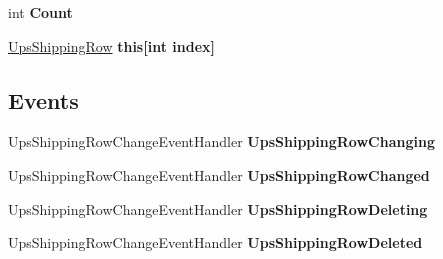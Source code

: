 \begin{DoxyCompactItemize}
\item 
int {\bfseries Count}\hypertarget{class_products_1_1_data_1_1ds_sage_1_1_ups_shipping_data_table_a0e08d69b2780d8485f76b3cde6fb65ab}{}\label{class_products_1_1_data_1_1ds_sage_1_1_ups_shipping_data_table_a0e08d69b2780d8485f76b3cde6fb65ab}

\item 
\hyperlink{class_products_1_1_data_1_1ds_sage_1_1_ups_shipping_row}{Ups\+Shipping\+Row} {\bfseries this\mbox{[}int index\mbox{]}}\hypertarget{class_products_1_1_data_1_1ds_sage_1_1_ups_shipping_data_table_ad176ac9cc4931b824d75b37665130b23}{}\label{class_products_1_1_data_1_1ds_sage_1_1_ups_shipping_data_table_ad176ac9cc4931b824d75b37665130b23}

\end{DoxyCompactItemize}
\subsection*{Events}
\begin{DoxyCompactItemize}
\item 
Ups\+Shipping\+Row\+Change\+Event\+Handler {\bfseries Ups\+Shipping\+Row\+Changing}\hypertarget{class_products_1_1_data_1_1ds_sage_1_1_ups_shipping_data_table_a08cae27724b75168269707eb6e67e56a}{}\label{class_products_1_1_data_1_1ds_sage_1_1_ups_shipping_data_table_a08cae27724b75168269707eb6e67e56a}

\item 
Ups\+Shipping\+Row\+Change\+Event\+Handler {\bfseries Ups\+Shipping\+Row\+Changed}\hypertarget{class_products_1_1_data_1_1ds_sage_1_1_ups_shipping_data_table_a9daa6c1720039f5cd70641c446f4e08d}{}\label{class_products_1_1_data_1_1ds_sage_1_1_ups_shipping_data_table_a9daa6c1720039f5cd70641c446f4e08d}

\item 
Ups\+Shipping\+Row\+Change\+Event\+Handler {\bfseries Ups\+Shipping\+Row\+Deleting}\hypertarget{class_products_1_1_data_1_1ds_sage_1_1_ups_shipping_data_table_a65f80ea216d44d8dab43f63d0d2ae3e3}{}\label{class_products_1_1_data_1_1ds_sage_1_1_ups_shipping_data_table_a65f80ea216d44d8dab43f63d0d2ae3e3}

\item 
Ups\+Shipping\+Row\+Change\+Event\+Handler {\bfseries Ups\+Shipping\+Row\+Deleted}\hypertarget{class_products_1_1_data_1_1ds_sage_1_1_ups_shipping_data_table_acbcea16b6a0ca85b14305ecb4261c070}{}\label{class_products_1_1_data_1_1ds_sage_1_1_ups_shipping_data_table_acbcea16b6a0ca85b14305ecb4261c070}

\end{DoxyCompactItemize}


